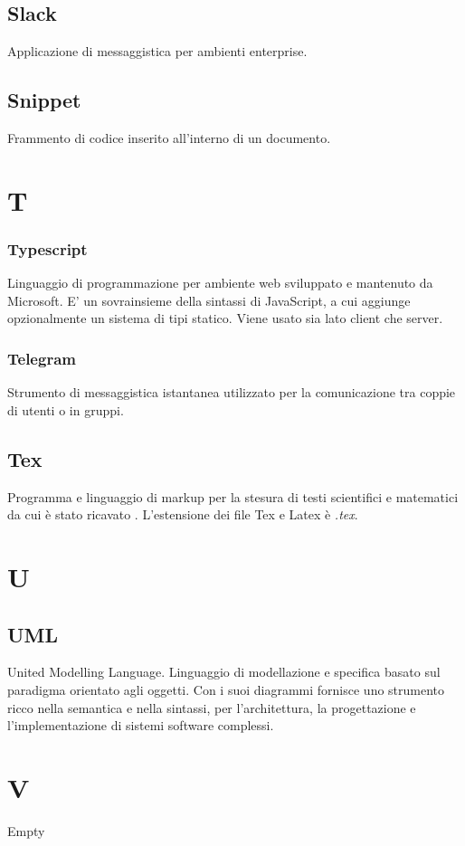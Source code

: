 \subsection*{Slack}
Applicazione di messaggistica per ambienti enterprise.

\subsection*{Snippet}
Frammento di codice inserito all'interno di un documento.

\section*{T}
\subsubsection*{Typescript}
Linguaggio di programmazione per ambiente web sviluppato e mantenuto da Microsoft. E' un sovrainsieme della sintassi di JavaScript,
a cui aggiunge opzionalmente un sistema di tipi statico. Viene usato sia lato client che server.
\subsubsection*{Telegram}
Strumento di messaggistica istantanea utilizzato per la comunicazione tra coppie di utenti o in gruppi.

\subsection*{Tex}
Programma e linguaggio di markup per la stesura di testi scientifici e matematici da cui è stato ricavato . L'estensione dei file Tex e Latex è \textit{.tex}.

\section*{U}

\subsection*{UML}
United Modelling Language. Linguaggio di modellazione e specifica basato sul paradigma orientato agli oggetti. Con i suoi diagrammi fornisce uno strumento  ricco nella semantica e nella sintassi, per l'architettura, la progettazione e l'implementazione di sistemi software complessi.

\section*{V}
Empty

